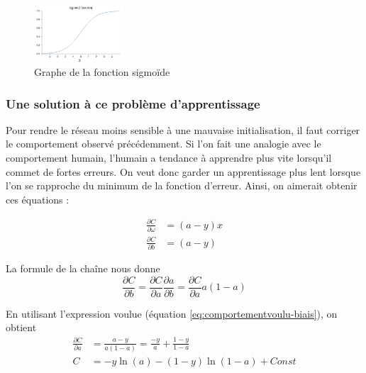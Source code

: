 \begin{figure}[h]
 \centering
 \includegraphics[width=0.3\textwidth]{img/sigmoid_function.png}
 \caption{Graphe de la fonction sigmoïde}
 \label{fig:sigmoid_function}
\end{figure}

\subsubsection{Une solution à ce problème d'apprentissage}
\label{subsubsection:etablissement-eq-entropiecroisee}

Pour rendre le réseau moins sensible à une mauvaise initialisation, il faut corriger le comportement observé précédemment. Si l'on fait une analogie avec le comportement humain, l'humain a tendance à apprendre plus vite lorsqu'il commet de fortes erreurs. On veut donc garder un apprentissage plus lent lorsque l'on se rapproche du minimum de la fonction d'erreur. Ainsi, on aimerait obtenir ces équations :

\begin{align}
  \label{eq:comportementvoulu-poids}
  \frac{\partial C}{\partial \omega} &= \left(a-y\right)x \\
  \frac{\partial C}{\partial b} &= \left(a-y\right)
  \label{eq:comportementvoulu-biais}
\end{align}

La formule de la chaîne nous donne 
\begin{equation}
 \frac{\partial C}{\partial b} = \frac{\partial C}{\partial a} \frac{\partial a}{\partial b} = \frac{\partial C}{\partial a} a\left(1-a\right)
\end{equation}

En utilisant l'expression voulue (équation \ref{eq:comportementvoulu-biais}), on obtient 
\begin{align}
 \frac{\partial C}{\partial a} &= \frac{a-y}{a\left(1-a\right)} = \frac{-y}{a} + \frac{1-y}{1-a} \\
 C &= -y\ln\left(a\right) - \left(1-y\right)\ln\left(1-a\right) + Const
\end{align}

